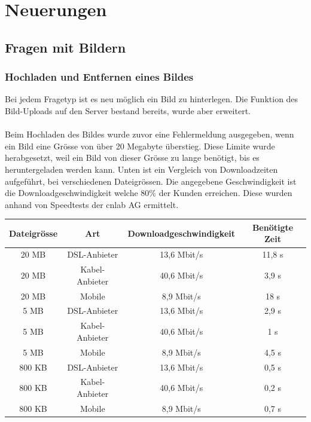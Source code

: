 \section{Neuerungen}

\subsection{Fragen mit Bildern}

\subsubsection{Hochladen und Entfernen eines Bildes}
Bei jedem Fragetyp ist es neu möglich ein Bild zu hinterlegen. Die Funktion des Bild-Uploads auf den Server bestand bereits, wurde aber erweitert.
\\
\\
Beim Hochladen des Bildes wurde zuvor eine Fehlermeldung ausgegeben, wenn ein Bild eine Grösse von über 20 Megabyte überstieg. Diese Limite wurde herabgesetzt, weil ein Bild von dieser Grösse zu lange benötigt, bis es heruntergeladen werden kann. Unten ist ein Vergleich von Downloadzeiten aufgeführt, bei verschiedenen Dateigrössen. Die angegebene Geschwindigkeit ist die Downloadgeschwindigkeit welche 80\% der Kunden erreichen. Diese wurden anhand von Speedtests der cnlab AG \cite{cnlab_speedtest} ermittelt. \\


\begin{tabular}{|c|c|c|c|}
	\hline 
	Dateigrösse & Art & Downloadgeschwindigkeit & Benötigte Zeit \\ 
	\hline 
	20 MB & DSL-Anbieter & 13,6 Mbit/s & 11,8 s \\ 
	\hline 
	20 MB & Kabel-Anbieter & 40,6 Mbit/s & 3,9 s \\ 
	\hline 
	20 MB & Mobile & 8,9 Mbit/s & 18 s \\ 
	\hline 
	5 MB & DSL-Anbieter & 13,6 Mbit/s & 2,9 s \\ 
	\hline 
	5 MB & Kabel-Anbieter & 40,6 Mbit/s & 1 s \\ 
	\hline 
	5 MB & Mobile & 8,9 Mbit/s & 4,5 s \\ 
	\hline 
	800 KB & DSL-Anbieter & 13,6 Mbit/s & 0,5 s \\ 
	\hline 
	800 KB & Kabel-Anbieter & 40,6 Mbit/s & 0,2 s \\ 
	\hline 
	800 KB & Mobile & 8,9 Mbit/s & 0,7 s \\ 
	\hline 
\end{tabular}\\

